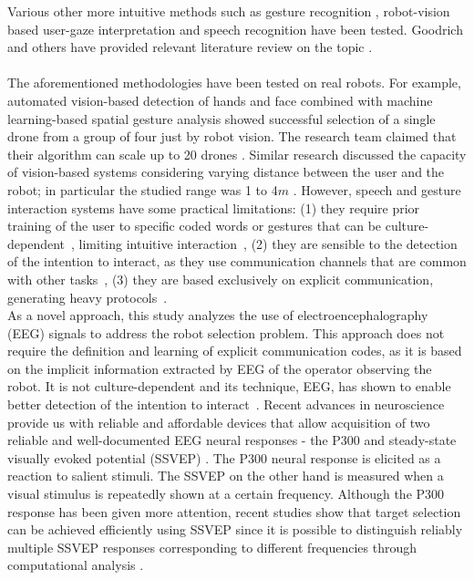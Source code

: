 \documentclass[smallextended]{svjour3}
\begin{document}
Various other more intuitive methods such as gesture recognition \cite{Couture-Beil2010,Jones2010,Monajjemi2013,Nagietal2014}, robot-vision based user-gaze interpretation \cite{Couture-Beil2010,Monajjemi2013,Pourmehr2013} and speech recognition \cite{Pourmehr2013} have been tested. Goodrich and others have provided relevant literature review on the topic \cite{goodrich2007human,Rule2012,yanco2004classifying}.\\
\\
The aforementioned methodologies have been tested on real robots. For example, automated vision-based detection of hands and face combined with machine learning-based spatial gesture analysis showed successful selection of a single drone from a group of four just by robot vision. 
The research team claimed that their algorithm can scale up to 20 drones \cite{Nagietal2014}. Similar research discussed the capacity of vision-based systems considering varying distance between the user and the robot; in particular the studied range was 1 to 4$m$ \cite{Couture-Beil2010}. 
However, speech and gesture interaction systems have some practical limitations: (1) they require prior training of the user to specific coded words or gestures that can be culture-dependent~\cite{Trovato2013}, limiting intuitive interaction~\cite{Kirchner2015},
(2) they are sensible to the detection of the intention to interact, as they use communication channels that are common with other tasks~\cite{Rzepecki2012}, (3) they are based exclusively on explicit communication, generating heavy protocols~\cite{Kirchner2015}.
\\ 
As a novel approach, this study analyzes the use of electroencephalography (EEG) signals to address the robot selection problem. 
This approach does not require the definition and learning of explicit communication codes, as it is based on the implicit information extracted by EEG of the operator observing the robot. 
It is not culture-dependent and its technique, EEG, has shown to enable better detection of the intention to interact~\cite{Rzepecki2012}.
Recent advances in neuroscience provide us with reliable and affordable devices that allow acquisition of two reliable and well-documented EEG neural responses - the P300 and steady-state visually evoked potential (SSVEP) \cite{Beverina2003,Bi2013,Zhu2010}. 
The P300 neural response is elicited as a reaction to salient stimuli. The SSVEP on the other hand is measured when a visual stimulus is repeatedly shown at a certain frequency. Although the P300 response has been given more attention, recent studies show that target selection can be achieved efficiently using SSVEP since it is possible to distinguish reliably multiple SSVEP responses corresponding to different frequencies through computational analysis \cite{SSVEPfiability}.
\end{document}
